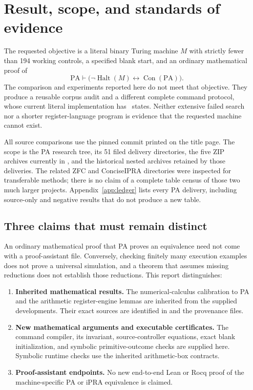 \documentclass[11pt,letterpaper]{article}
\newcommand{\PA}{\mathrm{PA}}
\newcommand{\Con}{\operatorname{Con}}
\newcommand{\Halt}{\operatorname{Halt}}
\begin{document}
\hypersetup{pageanchor=true}
\begingroup
\small
\setlength{\parskip}{0pt}
\tableofcontents
\endgroup
\clearpage
{}

\section{Result, scope, and standards of evidence}

The requested objective is a literal binary Turing machine $M$ with
strictly fewer than 194 working controls, a specified blank start, and an
ordinary mathematical proof of
\[
       \PA\vdash \bigl(\neg\Halt(M)\leftrightarrow\Con(\PA)\bigr).
\]
The comparison and experiments reported here do not meet that objective.
They produce a reusable corpus audit and a different complete command
protocol, whose current literal implementation has \prototypecount\ states.
Neither extensive failed search nor a shorter register-language program
is evidence that the requested machine cannot exist.

All source comparisons use the pinned commit printed on the title page.
The scope is the PA research tree, its 51 filed delivery directories,
the five ZIP archives currently in , and the historical
nested archives retained by those deliveries. The related ZFC and
ConciseIPRA directories were inspected for transferable methods; there
is no claim of a complete table census of those two much larger projects.
Appendix~\ref{app:ledger} lists every PA delivery, including source-only
and negative results that do not produce a new table.

\subsection{Three claims that must remain distinct}

An ordinary mathematical proof that PA proves an equivalence need not
come with a proof-assistant file. Conversely, checking finitely many
execution examples does not prove a universal simulation, and a theorem
that assumes missing reductions does not establish those reductions.
This report distinguishes:
\begin{enumerate}
\item \textbf{Inherited mathematical results.} The numerical-calculus
calibration to PA and the arithmetic register-engine lemmas are inherited
from the supplied developments. Their exact sources are identified in
 and the provenance files.
\item \textbf{New mathematical arguments and executable certificates.}
The command compiler, its invariant, source-controller equations, exact
blank initialization, and symbolic primitive-outcome checks are supplied
here. Symbolic runtime checks use the inherited arithmetic-box contracts.
\item \textbf{Proof-assistant endpoints.} No new end-to-end Lean or Rocq
proof of the machine-specific PA or iPRA equivalence is claimed.
\end{enumerate}
\end{document}
